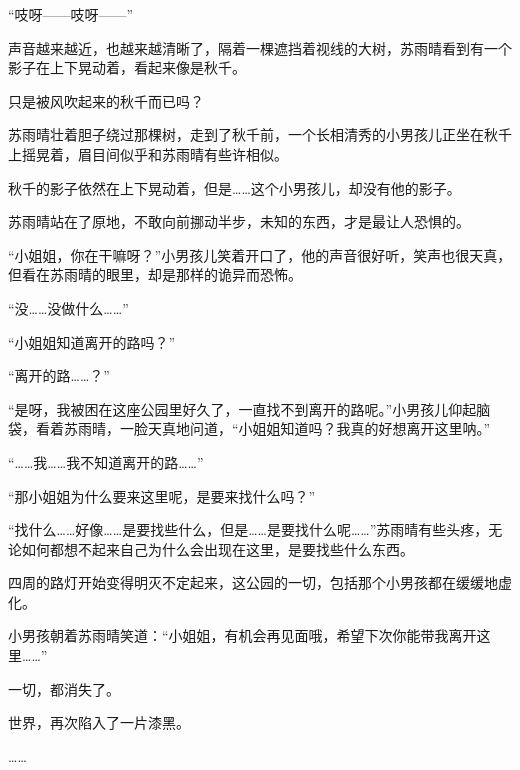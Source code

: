 “吱呀——吱呀——”

声音越来越近，也越来越清晰了，隔着一棵遮挡着视线的大树，苏雨晴看到有一个影子在上下晃动着，看起来像是秋千。

只是被风吹起来的秋千而已吗？

苏雨晴壮着胆子绕过那棵树，走到了秋千前，一个长相清秀的小男孩儿正坐在秋千上摇晃着，眉目间似乎和苏雨晴有些许相似。

秋千的影子依然在上下晃动着，但是……这个小男孩儿，却没有他的影子。

苏雨晴站在了原地，不敢向前挪动半步，未知的东西，才是最让人恐惧的。

“小姐姐，你在干嘛呀？”小男孩儿笑着开口了，他的声音很好听，笑声也很天真，但看在苏雨晴的眼里，却是那样的诡异而恐怖。

“没……没做什么……”

“小姐姐知道离开的路吗？”

“离开的路……？”

“是呀，我被困在这座公园里好久了，一直找不到离开的路呢。”小男孩儿仰起脑袋，看着苏雨晴，一脸天真地问道，“小姐姐知道吗？我真的好想离开这里呐。”

“……我……我不知道离开的路……”

“那小姐姐为什么要来这里呢，是要来找什么吗？”

“找什么……好像……是要找些什么，但是……是要找什么呢……”苏雨晴有些头疼，无论如何都想不起来自己为什么会出现在这里，是要找些什么东西。

四周的路灯开始变得明灭不定起来，这公园的一切，包括那个小男孩都在缓缓地虚化。

小男孩朝着苏雨晴笑道：“小姐姐，有机会再见面哦，希望下次你能带我离开这里……”

一切，都消失了。

世界，再次陷入了一片漆黑。

……
